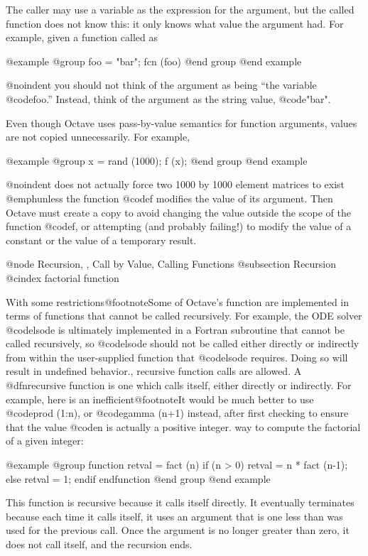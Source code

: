 The caller may use a variable as the expression for the argument, but
the called function does not know this: it only knows what value the
argument had.  For example, given a function called as

@example
@group
foo = "bar";
fcn (foo)
@end group
@end example

@noindent
you should not think of the argument as being ``the variable
@code{foo}.''  Instead, think of the argument as the string value,
@code{"bar"}.

Even though Octave uses pass-by-value semantics for function arguments,
values are not copied unnecessarily.  For example,

@example
@group
x = rand (1000);
f (x);
@end group
@end example

@noindent
does not actually force two 1000 by 1000 element matrices to exist
@emph{unless} the function @code{f} modifies the value of its
argument.  Then Octave must create a copy to avoid changing the
value outside the scope of the function @code{f}, or attempting (and
probably failing!) to modify the value of a constant or the value of a
temporary result.

@node Recursion,  , Call by Value, Calling Functions
@subsection Recursion
@cindex factorial function

With some restrictions@footnote{Some of Octave's function are
implemented in terms of functions that cannot be called recursively.
For example, the ODE solver @code{lsode} is ultimately implemented in a
Fortran subroutine that cannot be called recursively, so @code{lsode}
should not be called either directly or indirectly from within the
user-supplied function that @code{lsode} requires.  Doing so will result
in undefined behavior.}, recursive function calls are allowed.  A
@dfn{recursive function} is one which calls itself, either directly or
indirectly.  For example, here is an inefficient@footnote{It would be
much better to use @code{prod (1:n)}, or @code{gamma (n+1)} instead,
after first checking to ensure that the value @code{n} is actually a
positive integer.} way to compute the factorial of a given integer:

@example
@group
function retval = fact (n)
  if (n > 0)
    retval = n * fact (n-1);
  else
    retval = 1;
  endif
endfunction
@end group
@end example

This function is recursive because it calls itself directly.  It
eventually terminates because each time it calls itself, it uses an
argument that is one less than was used for the previous call.  Once the
argument is no longer greater than zero, it does not call itself, and
the recursion ends.

